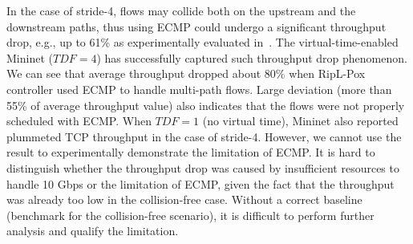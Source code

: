 In the case of stride-4, flows may collide both on the upstream and the downstream paths, thus using ECMP could undergo a significant throughput drop,
e.g., up to 61\% as experimentally evaluated in~\cite{Hedera}.
The virtual-time-enabled Mininet ($TDF=4$) has successfully captured such throughput drop phenomenon.
We can see that average throughput dropped about 80\% when RipL-Pox controller used ECMP to handle multi-path flows.
Large deviation (more than 55\% of average throughput value) also indicates that the flows were not properly scheduled with ECMP.
When $TDF=1$ (no virtual time), Mininet also reported plummeted TCP throughput in the case of stride-4.
However, we cannot use the result to experimentally demonstrate the limitation of ECMP.
It is hard to distinguish whether the throughput drop was caused by insufficient resources to handle 10 Gbps or the limitation of ECMP,
given the fact that the throughput was already too low in the collision-free case.
Without a correct baseline (benchmark for the collision-free scenario), it is difficult to perform further analysis and qualify the limitation.



